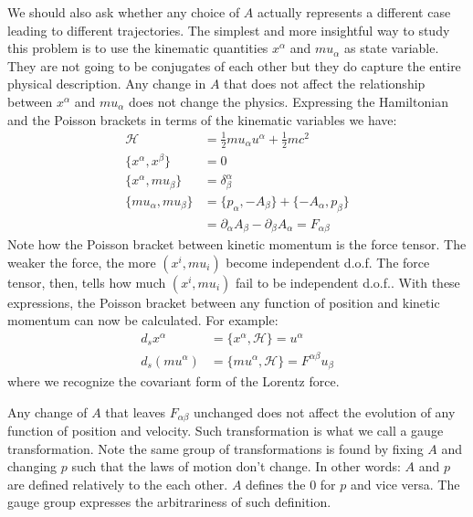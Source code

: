 \documentclass[aps,pra,10pt,twocolumn,floatfix,nofootinbib]{revtex4-1}
\numberwithin{equation}{section}
\theoremstyle{definition}
\begin{document}
We should also ask whether any choice of $A$ actually represents a different case leading to different trajectories. The simplest and more insightful way to study this problem is to use the kinematic quantities $x^\alpha$ and $mu_\alpha$ as state variable. They are not going to be conjugates of each other but they do capture the entire physical description. Any change in $A$ that does not affect the relationship between $x^\alpha$ and $mu_\alpha$ does not change the physics. Expressing the Hamiltonian and the Poisson brackets in terms of the kinematic variables we have:
\begin{align*}
\mathcal{H}&=\frac{1}{2}mu_\alpha u^\alpha + \frac{1}{2} m c^2 \\
\{x^\alpha, x^\beta\} &= 0 \\
\{x^\alpha, mu_\beta\} &= \delta^\alpha_\beta \\
\{mu_\alpha, mu_\beta\} &= \{p_\alpha, - A_\beta\} + \{-A_\alpha, p_\beta\} \\
&= \partial_\alpha A_\beta - \partial_\beta A_\alpha = F_{\alpha\beta}
\end{align*}
Note how the Poisson bracket between kinetic momentum is the force tensor. The weaker the force, the more $(x^i, mu_i)$ become independent d.o.f. The force tensor, then, tells how much $(x^i, mu_i)$ fail to be independent d.o.f.. With these expressions, the Poisson bracket between any function of position and kinetic momentum can now be calculated. For example:
\begin{align*}
d_s x^\alpha &= \{x^\alpha, \mathcal{H}\} = u^\alpha \\
d_s (mu^\alpha) &= \{mu^\alpha, \mathcal{H}\} = F^{\alpha\beta} u_\beta
\end{align*}
where we recognize the covariant form of the Lorentz force.

Any change of $A$ that leaves $F_{\alpha\beta}$ unchanged does not affect the evolution of any function of position and velocity. Such transformation is what we call a gauge transformation. Note the same group of transformations is found by fixing $A$ and changing $p$ such that the laws of motion don't change. In other words: $A$ and $p$ are defined relatively to the each other. $A$ defines the $0$ for $p$ and vice versa. The gauge group expresses the arbitrariness of such definition.
\end{document}
